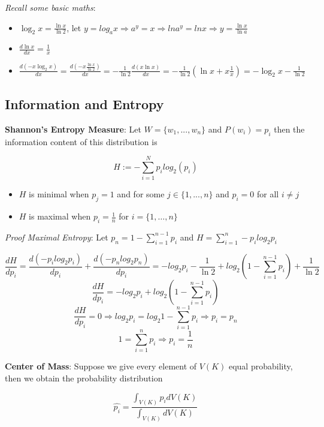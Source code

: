 \documentclass{article}
\begin{document}
\textit{Recall some basic maths}:

\begin{itemize}
    \item $\log_2{x} = \frac{\ln{x}}{\ln{2}}$, let $y = log_a{x} \Rightarrow a^y = x \Rightarrow ln{a^y} = ln{x} \Rightarrow y = \frac{\ln{x}}{\ln{a}}$
    \item $\frac{d\ln{x}}{dx} = \frac{1}{x}$
    \item $\frac{d(-x\log_2{x})}{dx} = \frac{ d(-x \frac{\ln{x}}{\ln{2}})}{dx} = -\frac{1}{\ln{2}} \frac{d(x\ln{x})}{dx} = -\frac{1}{\ln{2}}(\ln{x} + x\frac{1}{x}) = -\log_2{x} - \frac{1}{\ln{2}}$
\end{itemize}


\subsection{Information and Entropy}

\textbf{Shannon’s Entropy Measure}: Let $W = \{ w_1, ..., w_n\}$ and $P(w_i) = p_i$ then the information content of this distribution is

\begin{equation}
    H := -\sum^N_{i=1}{p_{i}log_2(p_i)}
\end{equation}

\begin{itemize}
    \item $H$ is minimal when $p_j = 1$ and for some $j \in \{ 1, ..., n\}$ and $p_i = 0$ for all $i \neq j$
    \item $H$ is maximal when $p_i = \frac{1}{n}$ for $i = \{1, \dots, n\}$
\end{itemize}

\textit{Proof Maximal Entropy}: Let $p_n = 1 - \sum^{n-1}_{i=1}p_i$ and $H = \sum^{n}_{i=1} - p_{i}log_2{p_i}$

$$\frac{dH}{dp_i} = \frac{d(-p_{i}log_{2}p_i)}{dp_i} + \frac{d(-p_{n}log_{2}p_n)}{dp_i} = -log_{2}p_i - \frac{1}{\ln2} + log_{2}(1 - \sum^{n-1}_{i=1}p_i) + \frac{1}{\ln2}$$
$$\frac{dH}{dp_i}  = -log_{2}p_i + log_{2}(1 - \sum^{n-1}_{i=1}p_i)$$
$$\frac{dH}{dp_i} = 0 \Rightarrow log_2{p_i} = log_2{1 - \sum^{n-1}_{i=1}p_i} \Rightarrow p_i = p_n$$
$$1 = \sum^{n}_{i=1}p_i \Rightarrow p_i = \frac{1}{n}$$


\textbf{Center of Mass}: Suppose we give every element of $V(K)$ equal probability, then we obtain the probability distribution

\begin{equation}
    \hat{p_i} = \frac{\int_{V(K)}p_{i}dV(K)}{\int_{V(K)}dV(K)}
\end{equation}
\end{document}
